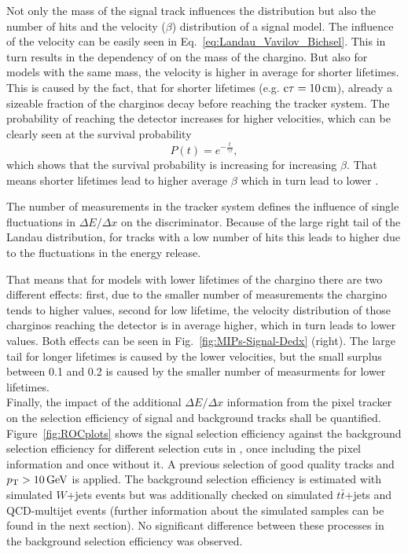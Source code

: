 Not only the mass of the signal track influences the \ias distribution but also the number of hits and the velocity ($\beta$) distribution of a signal model.
The influence of the velocity can be easily seen in Eq.~\ref{eq:Landau_Vavilov_Bichsel}. 
This in turn results in the dependency of \ias on the mass of the chargino.
But also for models with the same mass, the velocity is higher in average for shorter lifetimes.
This is caused by the fact, that for shorter lifetimes (e.g. $\text{c}\tau=10\,\text{cm}$), already a sizeable fraction of the charginos decay before reaching the tracker system.
The probability of reaching the detector increases for higher velocities, which can be clearly seen at the survival probability
\begin{equation}
P \left( t \right) = e^{-\frac{t}{\gamma \tau}},
\end{equation} 
which shows that the survival probability is increasing for increasing $\beta$. 
That means shorter lifetimes lead to higher average $\beta$ which in turn lead to lower \ias.

The number of measurements in the tracker system defines the influence of single fluctuations in $\Delta E/\Delta x$ on the \ias discriminator. 
Because of the large right tail of the Landau distribution, for tracks with a low number of hits this leads to higher \ias due to the  fluctuations in the energy release.

That means that for models with lower lifetimes of the chargino there are two different effects: 
first, due to the smaller number of measurements the chargino tends to higher \ias values, 
second for low lifetime, the velocity distribution of those charginos reaching the detector is in average higher, which in turn leads to lower  \ias values.
Both effects can be seen in Fig.~\ref{fig:MIPs-Signal-Dedx} (right).
The large tail for longer lifetimes is caused by the lower velocities, but the small surplus between 0.1 and 0.2 is caused by the smaller number of measurments for lower lifetimes.\\


Finally, the impact of the additional $\Delta E/\Delta x$ information from the pixel tracker on the selection efficiency of signal and background tracks shall be quantified.
Figure~\ref{fig:ROCplots} shows the signal selection efficiency against the background selection efficiency for different selection cuts in \ias, once including the pixel information and once without it.
A previous selection of good quality tracks and $p_{\text{T}}>10\,\text{Ge}\kern-0.06667em\text{V}$ is applied.
The background selection efficiency is estimated with simulated $W$+jets  events but was additionally checked on simulated $t\bar{t}$+jets  and QCD-multijet events 
(further information about the simulated samples can be found in the next section).
No significant difference between these processes in the background selection efficiency was observed.

